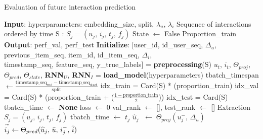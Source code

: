 \begin{algorithm}[H]
    \caption{Evaluation of future interaction prediction}
    \begin{algorithmic} 
        \STATE \textbf{Input}: hyperparameters: embedding\_size, split, $\lambda_u$, $\lambda_i$
        \STATE \quad \hspace{0.73cm}Sequence of interactions ordered by time S : $S_j = (u_j,\,i_j,\,t_j,\,f_j)$
        \STATE \quad \hspace{0.73cm}State $\leftarrow$ False 
        \STATE \quad \hspace{0.73cm}Proportion\_train
        \STATE \textbf{Output}: perf\_val, perf\_test
        \STATE \textbf{Initialize}: [user\_id, id\_user\_seq, $\Delta_u$, previous\_item\_seq, item\_id, id\_item\_seq, $\Delta_i$,\\
        \quad \hspace{1.2cm} timestamp\_seq, feature\_seq, y\_true\_labels] = \textbf{preprocessing}(S)
        \STATE \quad \hspace{1.2cm} $u_t$, $i_t$, $\Theta_{proj}$, $\Theta_{pred}$, $\Theta_{state}$, \textbf{RNN}$_U$, \textbf{RNN}$_I$ = \textbf{load\_model}(hyperparameters)
        \STATE \quad \hspace{1.2cm} tbatch\_timespan $\leftarrow \frac{\text{timestamp\_seq}_{\text{end}} - \text{timestamp\_seq}_{\text{start}}}{\text{split}}$
        \STATE \quad \hspace{1.2cm} idx\_train = Card(S) * (proportion\_train)
        \STATE \quad \hspace{1.2cm} idx\_val = Card(S) * (proportion\_train + ($\frac{1 - \text{proportion\_train}}{2}$))
        \STATE \quad \hspace{1.2cm} idx\_test = Card(S)
        \STATE \quad \hspace{1.2cm} tbatch\_time $\leftarrow$ \textbf{None}
        \STATE \quad \hspace{1.2cm} loss $\leftarrow$ 0
        \STATE \quad \hspace{1.2cm} val\_rank $\leftarrow$ [], test\_rank $\leftarrow$ []
            \STATE Extraction $S_j = (u_j,\,i_j,\,t_j,\,f_j)$
                \STATE tbatch\_time $\leftarrow$ $t_j$
            \ENDIF
            \STATE $\widehat u_j$ $\; \leftarrow \; \Theta_{proj}(u_j^-, \, \Delta_u)$
            \STATE $\overset{\sim}{i_j} \leftarrow \Theta_{pred}(\widehat u_j, \, \Bar{u}, \, i^-_j, \,\Bar{i})$

\end{algorithmic}
\end{algorithm}
